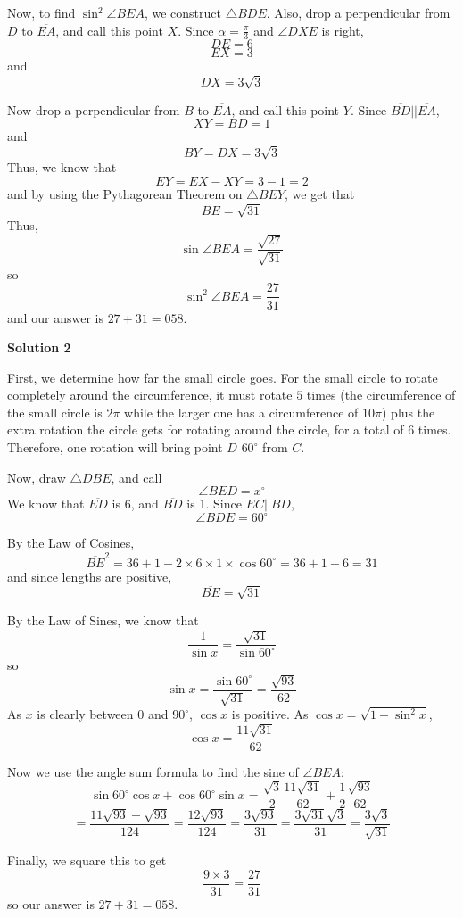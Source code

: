 \begin{enumerate}
 Now, to find $\sin^2{\angle BEA}$, we construct $\triangle BDE$. Also, drop a perpendicular from $D$ to $\overline{EA}$, and call this point $X$. Since $\alpha = \frac{\pi}{3}$ and $\angle DXE$ is right, 
 \[DE = 6\] 
 \[EX = 3\] and 
 \[DX = 3\sqrt{3}\] 

 Now drop a perpendicular from $B$ to $\overline{EA}$, and call this point $Y$. Since $\overline{BD} || \overline{EA}$, 
 \[XY = BD = 1\] and 
 \[BY = DX = 3\sqrt{3}\] Thus, we know that 
 \[EY = EX - XY = 3 - 1 = 2\] and by using the Pythagorean Theorem on $\triangle BEY$, we get that 
 \[BE = \sqrt{31}\] Thus, 
 \[\sin{\angle BEA} = \frac{\sqrt{27}}{\sqrt{31}}\] so 
 \[\sin^2{\angle BEA} = \frac{27}{31}\] and our answer is $27 + 31 = \boxed{058}$.

 



\textbf{Solution 2}

First, we determine how far the small circle goes. For the small circle to rotate completely around the circumference, it must rotate $5$ times (the circumference of the small circle is $2\pi$ while the larger one has a circumference of $10\pi$) plus the extra rotation the circle gets for rotating around the circle, for a total of $6$ times. Therefore, one rotation will bring point $D$ $60^\circ$ from $C$.

 Now, draw $\triangle DBE$, and call 
 \[\angle BED = x^{\circ}\] We know that $\overline{ED}$ is 6, and $\overline{BD}$ is 1. Since $EC || BD$, 
 \[\angle BDE = 60^\circ\] 

 By the Law of Cosines, 
 \[\overline{BE}^2=36+1-2\times 6\times 1\times \cos{60^\circ} = 36+1-6=31\] and since lengths are positive, 
 \[\overline{BE}=\sqrt{31}\] 

 By the Law of Sines, we know that 
 \[\frac{1}{\sin{x}}=\frac{\sqrt{31}}{\sin{60^\circ}}\] so 
 \[\sin{x} = \frac{\sin{60^\circ}}{\sqrt{31}} = \frac{\sqrt{93}}{62}\] As $x$ is clearly between $0$ and $90^\circ$, $\cos{x}$ is positive. As $\cos{x}=\sqrt{1-\sin^2{x}}$, 
 \[\cos{x} = \frac{11\sqrt{31}}{62}\] 

 Now we use the angle sum formula to find the sine of $\angle BEA$: 
 \[\sin 60^\circ\cos x + \cos 60^\circ\sin x = \frac{\sqrt{3}}{2}\frac{11\sqrt{31}}{62}+\frac{1}{2}\frac{\sqrt{93}}{62}\] 
 \[= \frac{11\sqrt{93}+\sqrt{93}}{124} = \frac{12\sqrt{93}}{124} = \frac{3\sqrt{93}}{31} = \frac{3\sqrt{31}\sqrt{3}}{31} = \frac{3\sqrt{3}}{\sqrt{31}}\]

 Finally, we square this to get 
 \[\frac{9\times 3}{31}=\frac{27}{31}\] so our answer is $27+31=\boxed{058}$.


\end{enumerate}
